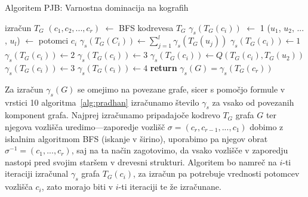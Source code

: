 \documentclass[12pt,a4paper,twoside]{article}
\theoremstyle{definition} %
\theoremstyle{plain} %
\numberwithin{equation}{section}  %
\begin{document}
\begin{algorithm}[h!]
\caption{Algoritem PJB: Varnostna dominacija na kografih}\label{alg:pradhan}
\begin{algorithmic}[1]
\State izračun $T_G$
\State $(c_1, c_2, ..., c_r)$ $\leftarrow$ BFS kodrevesa $T_G$
    	\State $\gamma_s(T_G(c_i))$  $\leftarrow$ 1
    \Else
    	\State ($u_1$, $u_2$, ... , $u_l$) $\leftarrow$ potomci $c_i$
        	\State $\gamma_s(T_G(C_i)) \leftarrow \sum\limits_{j=1}^l \gamma_s(T_G(u_j))$
          \Else  \hfill{}
             	\State $\gamma_s(T_G(c_i)) \leftarrow 1$
             	\State $\gamma_s(T_G(c_i)) \leftarrow 2$
                 \State $\gamma_s(T_G(c_i)) \leftarrow 3$
                  	\State $\gamma_s(T_G(c_i)) \leftarrow Q(T_G(c_i), T_G(u_2))$
                    		\State $\gamma_s(T_G(c_i)) \leftarrow 3$
                    	\Else
                    		\State $\gamma_s(T_G(c_i)) \leftarrow 4$
                    	\EndIf
                  \EndIf
                \EndIf
            \EndIf
\EndFor
\State \textbf{return} $\gamma_s(G) = \gamma_s(T_G(c_r))$
\EndFunction
\end{algorithmic}
\end{algorithm}

Za izračun $\gamma_s(G)$ se omejimo na povezane grafe, sicer s pomočjo formule v vrstici 10 algoritma~\ref{alg:pradhan} izračunamo število $\gamma_s$ za vsako od povezanih komponent grafa. Najprej izračunamo pripadajoče kodrevo $T_G$ grafa $G$ ter njegova vozlišča uredimo---zaporedje vozlišč $\sigma = (c_r, c_{r-1}, ..., c_1)$ dobimo z iskalnim algoritmom BFS (iskanje v širino), uporabimo pa njegov obrat $\sigma ^{-1} = (c_1, ..., c_r)$, saj na ta način zagotovimo, da vsako vozlišče v zaporedju nastopi pred svojim staršem v drevesni strukturi. Algoritem bo namreč na $i$-ti iteraciji izračunal $\gamma_s$ grafa $T_G(c_i)$, za izračun pa potrebuje vrednosti potomcev vozlišča $c_i$, zato morajo biti v $i$-ti iteraciji te že izračunane.
\end{document}
